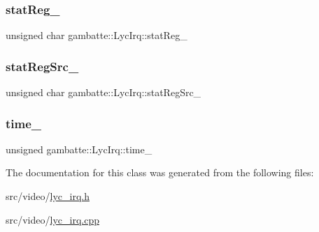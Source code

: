 \subsubsection{\texorpdfstring{stat\+Reg\+\_\+}{statReg\_}}
{\footnotesize\ttfamily unsigned char gambatte\+::\+Lyc\+Irq\+::stat\+Reg\+\_\+\hspace{0.3cm}{\ttfamily [private]}}

\mbox{\label{classgambatte_1_1LycIrq_a55a0557978976b6ae82c0de34f99f544}} 
\subsubsection{\texorpdfstring{stat\+Reg\+Src\+\_\+}{statRegSrc\_}}
{\footnotesize\ttfamily unsigned char gambatte\+::\+Lyc\+Irq\+::stat\+Reg\+Src\+\_\+\hspace{0.3cm}{\ttfamily [private]}}

\mbox{\label{classgambatte_1_1LycIrq_a7d1f9705467f2bd76cd1cb03d1dcdae7}} 
\subsubsection{\texorpdfstring{time\+\_\+}{time\_}}
{\footnotesize\ttfamily unsigned gambatte\+::\+Lyc\+Irq\+::time\+\_\+\hspace{0.3cm}{\ttfamily [private]}}



The documentation for this class was generated from the following files\+:\begin{DoxyCompactItemize}
\item 
src/video/\hyperlink{lyc__irq_8h}{lyc\+\_\+irq.\+h}\item 
src/video/\hyperlink{lyc__irq_8cpp}{lyc\+\_\+irq.\+cpp}\end{DoxyCompactItemize}
